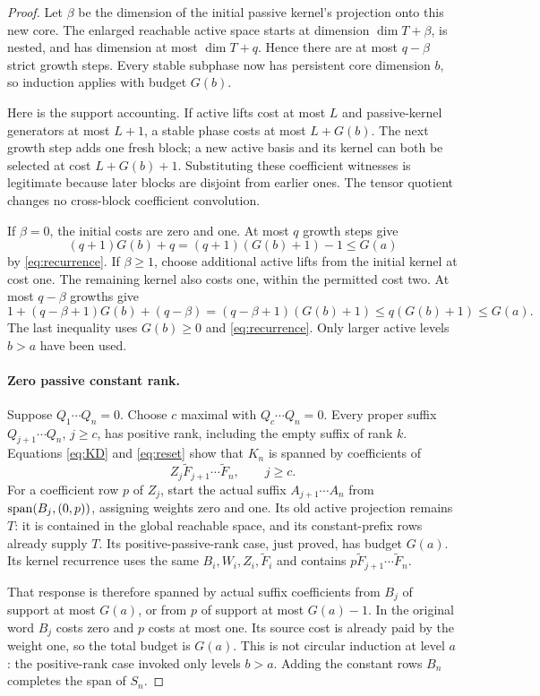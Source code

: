\begin{proof}
Let $\beta$ be the dimension of the initial passive kernel's projection
onto this new core. The enlarged reachable active space starts at
dimension $\dim T+\beta$, is nested, and has dimension at most
$\dim T+q$. Hence there are at most $q-\beta$ strict growth steps.
Every stable subphase now has persistent core dimension $b$, so
induction applies with budget $G(b)$.

Here is the support accounting. If active lifts cost at most $L$ and
passive-kernel generators at most $L+1$, a stable phase costs at most
$L+G(b)$. The next growth step adds one fresh block; a new active
basis and its kernel can both be selected at cost $L+G(b)+1$.
Substituting these coefficient witnesses is legitimate because later
blocks are disjoint from earlier ones. The tensor quotient changes
no cross-block coefficient convolution.

If $\beta=0$, the initial costs are zero and one. At most $q$ growth
steps give
\[
 (q+1)G(b)+q=(q+1)(G(b)+1)-1\le G(a)
\]
by \eqref{eq:recurrence}. If $\beta\ge1$, choose additional active
lifts from the initial kernel at cost one. The remaining kernel also
costs one, within the permitted cost two. At most $q-\beta$ growths
give
\[
 1+(q-\beta+1)G(b)+(q-\beta)
 =(q-\beta+1)(G(b)+1)
 \le q(G(b)+1)\le G(a).
\]
The last inequality uses $G(b)\ge0$ and \eqref{eq:recurrence}.
Only larger active levels $b>a$ have been used.

\paragraph{Zero passive constant rank.}
Suppose $Q_1\cdots Q_n=0$. Choose $c$ maximal with
$Q_c\cdots Q_n=0$. Every proper suffix $Q_{j+1}\cdots Q_n$,
$j\ge c$, has positive rank, including the empty suffix of rank $k$.
Equations \eqref{eq:KD} and \eqref{eq:reset} show that $K_n$ is
spanned by coefficients of
\[
 Z_j\widetilde F_{j+1}\cdots\widetilde F_n,\qquad j\ge c.
\]
For a coefficient row $p$ of $Z_j$, start the actual suffix
$A_{j+1}\cdots A_n$ from $\operatorname{span}(B_j,(0,p))$, assigning weights
zero and one. Its old active projection remains $T$: it is contained
in the global reachable space, and its constant-prefix rows already
supply $T$. Its positive-passive-rank case, just proved, has budget
$G(a)$. Its kernel recurrence uses the same $B_i,W_i,Z_i,
\widetilde F_i$ and contains
$p\widetilde F_{j+1}\cdots\widetilde F_n$.

That response is therefore spanned by actual suffix coefficients
from $B_j$ of support at most $G(a)$, or from $p$ of support at most
$G(a)-1$. In the original word $B_j$ costs zero and $p$ costs at most
one. Its source cost is already paid by the weight one, so the total
budget is $G(a)$. This is not circular induction at level $a$:
the positive-rank case invoked only levels $b>a$. Adding the constant
rows $B_n$ completes the span of $S_n$.


\end{proof}
